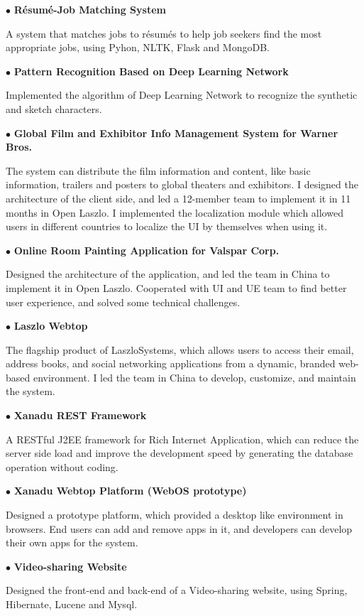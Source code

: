 \documentclass[10pt]{article}
\begin{document}
$\bullet$ \textbf{ R\'esum\'e-Job Matching System  }

A system that matches jobs to r\'esum\'es to help job seekers find the most appropriate jobs, using Pyhon, NLTK, Flask and MongoDB.

$\bullet$ \textbf{ Pattern Recognition Based on Deep Learning Network }

Implemented the algorithm of Deep Learning Network to recognize the synthetic and sketch characters.

$\bullet$ \textbf{ Global Film and Exhibitor Info Management System for Warner Bros.}

The system can distribute the film information and content, like basic information, trailers and posters to global theaters and exhibitors. I designed the architecture of the client side, and led a 12-member team to implement it in 11 months in Open Laszlo. I implemented the localization module which allowed users in different countries to localize the UI by themselves when using it.

$\bullet$ \textbf{ Online Room Painting Application for Valspar Corp. }

Designed the architecture of the application, and led the team in China to implement it in Open Laszlo. Cooperated with UI and UE team to find better user experience, and solved some technical challenges.

$\bullet$ \textbf{ Laszlo Webtop }

The flagship product of LaszloSystems, which allows users to access their email, address books, and social networking applications from a dynamic, branded web-based environment. I led the team in China to develop, customize, and maintain the system.

$\bullet$ \textbf{ Xanadu REST Framework}

A RESTful J2EE framework for Rich Internet Application, which can  reduce the server side load and improve the development speed by generating the database operation without coding.

$\bullet$ \textbf{ Xanadu Webtop Platform (WebOS prototype)}

Designed a prototype platform, which provided a desktop like environment in browsers. End users can add and remove apps in it, and developers can develop their own apps for the system.


$\bullet$ \textbf{ Video-sharing Website }

Designed the front-end and back-end of a Video-sharing website, using Spring, Hibernate, Lucene and Mysql.


\end{document}
